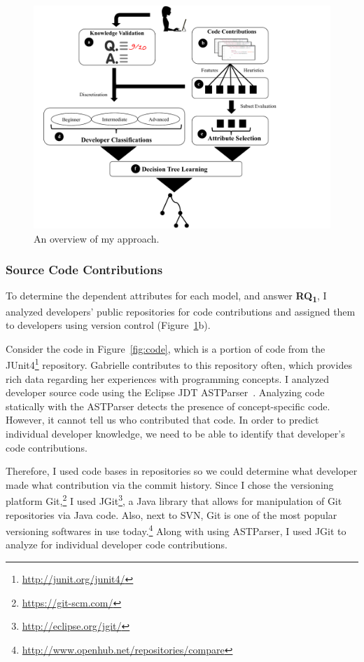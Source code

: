 \begin{figure} [ht]
	\centering
	\includegraphics[width=4.5in]{Chapter-6/figs/approach-fig.pdf}
	\caption{An overview of my approach.}
	\label{fig:approach}
\end{figure}

\subsubsection*{Source Code Contributions} \label{subsec:code}

To determine the dependent attributes for each model, and answer \textbf{RQ\textsubscript{1}}, I analyzed developers' public repositories for code contributions and assigned them to developers using version control (Figure~\ref{fig:approach}b).

Consider the code in Figure~\ref{fig:code}, which is a portion of code from the JUnit4\footnote{\url{http://junit.org/junit4/}} repository. Gabrielle contributes to this repository often, which provides rich data regarding her experiences with programming concepts. I analyzed developer source code using the Eclipse JDT ASTParser~\cite{eclipseASTParser}. Analyzing code statically with the ASTParser detects the presence of concept-specific code. However, it cannot tell us who contributed that code. In order to predict individual developer knowledge, we need to be able to identify that developer's code contributions.

Therefore, I used code bases in repositories so we could determine what developer made what contribution via the commit history. Since I chose the versioning platform Git,\footnote{\url{https://git-scm.com/}} I used JGit\footnote{\url{http://eclipse.org/jgit/}}, a Java library that allows for manipulation of Git repositories via Java code. Also,  next to SVN, Git is one of the most popular versioning softwares in use today.\footnote{\url{http://www.openhub.net/repositories/compare}}  Along with using ASTParser, I used JGit to analyze for individual developer code contributions. 

